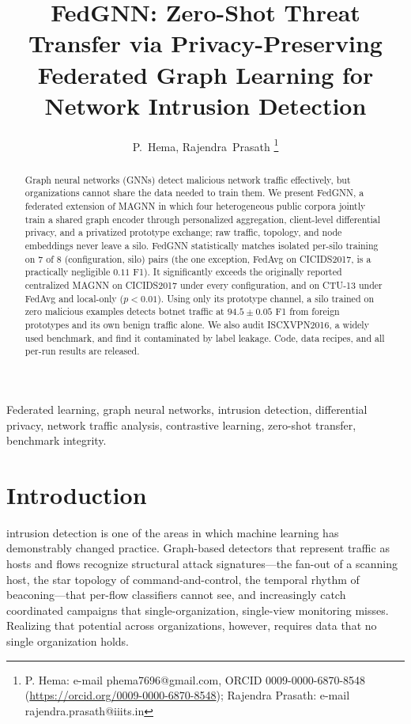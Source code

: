\documentclass[journal]{IEEEtran}
\begin{document}
\title{FedGNN: Zero-Shot Threat Transfer via Privacy-Preserving\\
Federated Graph Learning for Network Intrusion Detection}

\author{P.~Hema, Rajendra~Prasath%
\thanks{P. Hema: e-mail phema7696@gmail.com, ORCID 0009-0000-6870-8548 (\mbox{\url{https://orcid.org/0009-0000-6870-8548}}); Rajendra Prasath: e-mail rajendra.prasath@iiits.in}%
}

\maketitle

\begin{abstract}
Graph neural networks (GNNs) detect malicious network traffic
effectively, but organizations cannot share the data needed to train
them. We present FedGNN, a federated extension of MAGNN in which four
heterogeneous public corpora jointly train a shared graph encoder
through personalized aggregation, client-level differential privacy,
and a privatized prototype exchange; raw traffic, topology, and node
embeddings never leave a silo. FedGNN statistically matches isolated
per-silo training on 7 of 8 (configuration, silo) pairs (the one
exception, FedAvg on CICIDS2017, is a practically negligible $0.11$
F1). It significantly exceeds the originally reported centralized
MAGNN on CICIDS2017 under every configuration, and on CTU-13 under
FedAvg and local-only ($p{<}0.01$). Using only its prototype channel, a
silo trained on zero malicious examples detects botnet traffic at
$94.5 \pm 0.05$ F1 from foreign prototypes and its own benign traffic
alone. We also audit ISCXVPN2016, a widely used benchmark, and find it
contaminated by label leakage. Code, data recipes, and all per-run
results are released.
\end{abstract}

\begin{IEEEkeywords}
Federated learning, graph neural networks, intrusion detection,
differential privacy, network traffic analysis, contrastive learning,
zero-shot transfer, benchmark integrity.
\end{IEEEkeywords}

\section{Introduction}
\label{sec:intro}

 intrusion detection is one of the areas in
which machine learning has demonstrably changed practice. Graph-based
detectors that represent traffic as hosts and flows recognize
structural attack signatures---the fan-out of a scanning host, the
star topology of command-and-control, the temporal rhythm of
beaconing---that per-flow classifiers cannot see, and increasingly
catch coordinated campaigns that single-organization, single-view
monitoring misses. Realizing that potential across organizations,
however, requires data that no single organization holds.
\end{document}
